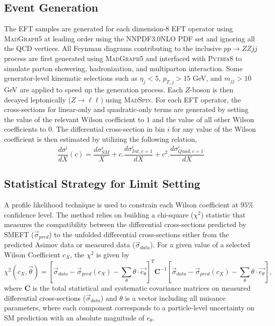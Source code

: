 \subsection{Event Generation}
\label{subsec:EFT_EventGen}
The EFT samples are generated for each dimension-8 EFT operator using \textsc{MadGraph5} at leading order using the NNPDF3.0NLO PDF set and ignoring all the QCD vertices.
All Feynman diagrams contributing to the inclusive $pp \rightarrow ZZ jj$ process are first generated using \textsc{MadGraph5} and interfaced with \textsc{Pythia8} to simulate parton showering, hadronization, and multiparton interaction. Some generator-level kinematic selections such as $\eta_{j}<5$, $p_{T,j} > 15$ GeV, and $m_{jj} > 10$ GeV are applied to speed up the generation process. Each $Z$-boson is then decayed leptonically ($Z\rightarrow \ell \ell$) using \textsc{MadSpin}. For each EFT operator, the cross-sections for linear-only and quadratic-only terms are generated by setting the value of the relevant Wilson coefficient to $1$ and the value of all other Wilson coefficients to $0$. The differential cross-section in bin $i$ for any value of the Wilson coefficient is then estimated by utilizing the following relation,
\begin{equation}
\frac{d\sigma ^{i}}{dX}(c) = \frac{d\sigma ^{i}_{SM}}{X} + c . \frac{d\sigma ^{i}_{Int, c=1}}{dX} + c^2 . \frac{d\sigma ^{i}_{Quad, c=1}}{dX}
\label{eqn:DiffxS_EFT}
\end{equation}

\subsection{Statistical Strategy for Limit Setting}
\label{subsec:EFT_Method}
A profile likelihood technique \cite{ProfileLikelihood} is used to constrain each Wilson coefficient at $95\%$ confidence level. The method relies on building a chi-square ($\chi^2$) statistic that measures the compatibility between the differential cross-sections predicted by SMEFT ($\vec{\sigma}_{pred}$) to the unfolded differential cross-sections either from the predicted Asimov data or measured data ($\vec{\sigma}_{data}$). For a given value of a selected Wilson Coefficient $c_X$, the $\chi^2$ is given by
\begin{equation}
    \chi^2(c_X, \vec{\theta}) = [\vec{\sigma}_{data} - \vec{\sigma}_{pred}(c_X)- \sum_{\theta}\theta\cdot\vec{e_\theta} ]^T \textbf{C}^{-1}[\vec{\sigma}_{data}  - \vec{\sigma}_{pred}(c_X) - \sum_{\theta}\theta\cdot\vec{e_\theta}],
    \label{eq:eftchi2}
\end{equation} 
where $\textbf{C}$ is the total statistical and systematic covariance matrices on measured differential cross-sections ($\vec{\sigma}_{data}$) and $\theta$ is a vector including all nuisance parameters, where each component corresponds to a particle-level uncertainty on SM prediction with an absolute magnitude of $e_{\theta}$.


